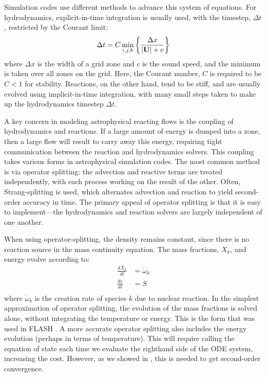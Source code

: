 \documentclass[modern]{aastex631}
\newcommand{\Ub}{{\bf{U}}}
\newcommand{\omegadot}{\dot{\omega}}
\begin{document}
Simulation codes use different methods to advance this system of equations.  For hydrodynamics,
explicit-in-time integration is usually used, with the timestep, $\Delta t$, restricted by the Courant limit:
\begin{equation}
\Delta t = C \min_{i,j,k} \left \{ \frac{\Delta x}{|\Ub| + c} \right \}
\end{equation}
where $\Delta x$ is the width of a grid zone and $c$ is the sound
speed, and the minimum is taken over all zones on the grid.  Here, the
Courant number, $C$ is required to be $C < 1$ for stability.
Reactions, on the other hand, tend to be stiff, and are usually evolved
using implicit-in-time integration, with many small steps taken to
make up the hydrodynamics timestep $\Delta t$.

A key concern in modeling astrophysical reacting flows is the coupling
of hydrodynamics and reactions.  If a large amount of energy is dumped
into a zone, then a large flow will result to carry away this energy,
requiring tight communication between the reaction and hydrodynamics
solvers.  This coupling takes various forms in astrophysical
simulation codes.  The most common method is via operator splitting:
the advection and reactive terms are treated independently, with each
process working on the result of the other.  Often, Strang-splitting
\citep{strang:1968} is used, which alternates advection and reaction
to yield second-order accuracy in time.  The primary appeal of operator
splitting is that it is easy to implement---the hydrodynamics and reaction
solvers are largely independent of one another.

When using operator-splitting, the density remains constant, since there
is no reaction source in the mass continuity equation.  The mass
fractions, $X_k$, and energy evolve according to:
\begin{eqnarray}
\frac{dX_k}{dt} &= \omegadot_k \\
\frac{de}{dt} &= \dot{S} \\
\end{eqnarray}
where $\omegadot_k$ is the creation rate of species $k$ due to nuclear
reaction.  In the simplest approximation of operator splitting, the
evolution of the mass fractions is solved alone, without integrating
the temperature or energy.  This is the form that was used in FLASH
\cite{flash}.  A more accurate operator splitting also includes the
energy evolution (perhaps in terms of temperature).  This will require
calling the equation of state each time we evaluate the righthand side
of the ODE system, increasing the cost.  However, as we showed in
\citet{strang_rnaas}, this is needed to get second-order convergence.
\end{document}
